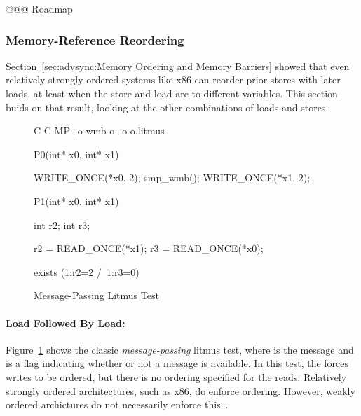 @@@ Roadmap

\subsubsection{Memory-Reference Reordering}
\label{sec:advsync:Memory-Reference Reordering}

Section~\ref{sec:advsync:Memory Ordering and Memory Barriers}
showed that even relatively strongly ordered systems like x86
can reorder prior stores with later loads, at least when the
store and load are to different variables.
This section buids on that result, looking at the other combinations of
loads and stores.


\begin{figure}[tbp]
{ \scriptsize
\begin{verbbox}[\LstLineNo]
C C-MP+o-wmb-o+o-o.litmus

{
}


P0(int* x0, int* x1) {

  WRITE_ONCE(*x0, 2);
  smp_wmb();
  WRITE_ONCE(*x1, 2);

}

P1(int* x0, int* x1) {

  int r2;
  int r3;

  r2 = READ_ONCE(*x1);
  r3 = READ_ONCE(*x0);

}

exists (1:r2=2 /\ 1:r3=0)
\end{verbbox}
}
\centering
\theverbbox
\caption{Message-Passing Litmus Test}
\label{fig:advsync:Message-Passing Litmus Test}
\end{figure}

\paragraph{Load Followed By Load:}
Figure~\ref{fig:advsync:Message-Passing Litmus Test}
shows the classic \emph{message-passing} litmus test, where  is
the message and  is a flag indicating whether or not a message
is available.
In this test, the  forces  writes to be ordered,
but there is no ordering specified for the reads.
Relatively strongly ordered architectures, such as x86, do enforce ordering.
However, weakly ordered archictures do not necessarily enforce
this~\cite{JadeAlglave2011ppcmem}.

